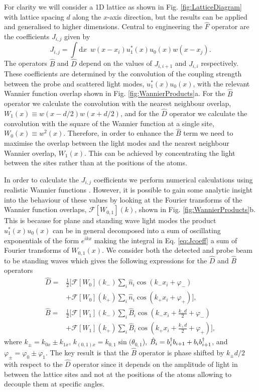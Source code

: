 For clarity we will consider a 1D lattice as shown in
Fig. \ref{fig:LatticeDiagram} with lattice spacing $d$ along the
$x$-axis direction, but the results can be applied and generalised to
higher dimensions. Central to engineering the $\hat{F}$ operator are
the coefficients $J_{i,j}$ given by
\begin{equation}
  \label{eq:Jcoeff}
  J_{i,j} = \int \mathrm{d} x \,\,\, w(x - x_i) u_1^*(x) u_0(x) w(x - x_j).
\end{equation}
The operators $\hat{B}$ and $\hat{D}$ depend on the values of
$J_{i,i+1}$ and $J_{i,i}$ respectively. These coefficients are
determined by the convolution of the coupling strength between the
probe and scattered light modes, $u_1^*(x)u_0(x)$, with the relevant
Wannier function overlap shown in Fig. \ref{fig:WannierProducts}a. For
the $\hat{B}$ operator we calculate the convolution with the nearest
neighbour overlap, $W_1(x) \equiv w(x - d/2) w(x + d/2)$, and for the
$\hat{D}$ operator we calculate the convolution with the square of the
Wannier function at a single site, $W_0(x) \equiv w^2(x)$. Therefore,
in order to enhance the $\hat{B}$ term we need to maximise the overlap
between the light modes and the nearest neighbour Wannier overlap,
$W_1(x)$. This can be achieved by concentrating the light between the
sites rather than at the positions of the atoms. 

In order to calculate the $J_{i,j}$ coefficients we perform numerical
calculations using realistic Wannier functions
\cite{walters2013}. However, it is possible to gain some analytic
insight into the behaviour of these values by looking at the Fourier
transforms of the Wannier function overlaps,
$\mathcal{F}[W_{0,1}](k)$, shown in Fig.
\ref{fig:WannierProducts}b. This is because for plane and standing
wave light modes the product $u_1^*(x) u_0(x)$ can be in general
decomposed into a sum of oscillating exponentials of the form
$e^{i k x}$ making the integral in Eq. \eqref{eq:Jcoeff} a sum of
Fourier transforms of $W_{0,1}(x)$. We consider both the detected and
probe beam to be standing waves which gives the following expressions
for the $\hat{D}$ and $\hat{B}$ operators
\begin{align}
  \label{eq:FTs}
  \hat{D} = & \frac{1}{2}[\mathcal{F}[W_0](k_-)\sum_i\hat{n}_i\cos(k_-
              x_i +\varphi_-) \nonumber\\ 
            & + \mathcal{F}[W_0](k_+)\sum_i\hat{n}_i\cos(k_+ x_i +\varphi_+)],
              \nonumber\\ 
  \hat{B} = & \frac{1}{2}[\mathcal{F}[W_1](k_-)\sum_i\hat{B}_i\cos(k_- x_i
              +\frac{k_-d}{2}+\varphi_-) \nonumber\\ 
            & +\mathcal{F}[W_1](k_+)\sum_i\hat{B}_i\cos(k_+
              x_i +\frac{k_+d}{2}+\varphi_+)],
\end{align}
where $k_\pm = k_{0x} \pm k_{1x}$,
$k_{(0,1)x} = k_{0,1} \sin(\theta_{0,1}$),
$\hat{B}_i=b^\dagger_ib_{i+1}+b_ib^\dagger_{i+1}$, and
$\varphi_\pm=\varphi_0 \pm \varphi_1$. The key result is that the
$\hat{B}$ operator is phase shifted by $k_\pm d/2$ with respect to the
$\hat{D}$ operator since it depends on the amplitude of light in
between the lattice sites and not at the positions of the atoms
allowing to decouple them at specific angles.

